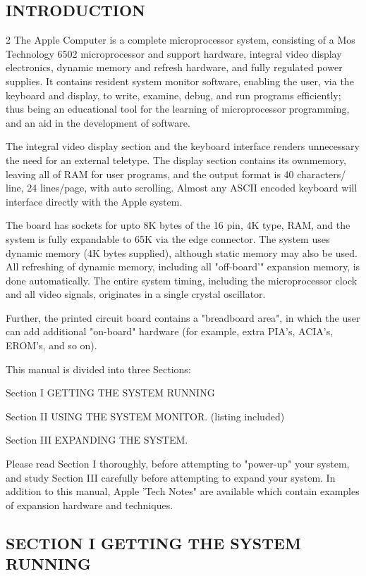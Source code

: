 \documentclass[letterpaper]{article}
\begin{document}
\newpage
{}
\begin{center}
\section{INTRODUCTION}
\end{center}
\begin{multicols}{2}
{\bodyfont
The Apple Computer is a complete microprocessor system, consisting of a Mos Technology 6502 microprocessor and support hardware, integral video display electronics, dynamic memory and refresh hardware, and fully regulated power supplies. It contains resident system monitor software, enabling the user, via the keyboard and display, to write, examine, debug, and run programs efficiently; thus being an educational tool for the learning of microprocessor programming, and an aid in the development of software.
}

The integral video display section and the keyboard interface renders unnecessary the need for an external teletype. The display section contains its ownmemory, leaving all of RAM for user programs, and the output format is 40 characters/ line, 24 lines/page, with auto scrolling. Almost any ASCII encoded keyboard will interface directly with the Apple system.

The board has sockets for upto 8K bytes of the 16 pin, 4K type, RAM, and the system is fully expandable to 65K via the edge connector. The system uses dynamic memory (4K bytes supplied), although static memory may also be used. All refreshing of dynamic memory, including all "off-board'" expansion memory, is done automatically. The entire system timing, including the microprocessor clock and all video signals, originates in a single crystal oscillator.

Further, the printed circuit board contains a "breadboard area", in which the user can add additional "on-board" hardware (for example, extra PIA's, ACIA's, EROM's, and so on).

This manual is divided into three Sections:

\noindent Section I GETTING THE SYSTEM RUNNING

\noindent Section II USING THE SYSTEM MONITOR. (listing included)

\noindent Section III EXPANDING THE SYSTEM.

Please read Section I thoroughly, before attempting to "power-up" your system, and study Section III carefully before attempting to expand your system. In addition to this manual, Apple 'Tech Notes" are available which contain examples of expansion hardware and techniques.
\end{multicols}
\begin{center}
\section{SECTION I
\newline
GETTING THE SYSTEM RUNNING}   
\end{center}
\end{document}
